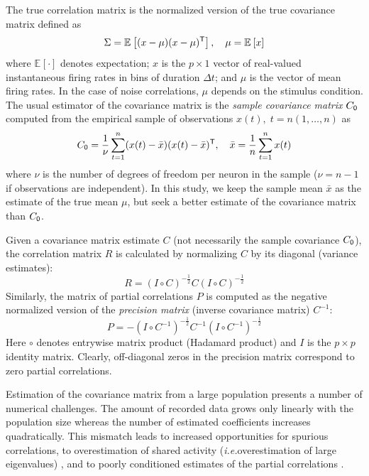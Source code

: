 \documentclass[10pt]{article}
\newcommand{\T}{{\sf T}}
\newcommand{\E}[2][]{\mathbb E_{#1}\left[ #2\right]}    %
\begin{document}
The true correlation matrix is the normalized version of the true covariance matrix defined as
\begin{equation}\label{eq:true-covariance}
    \Sigma = \E{(x-\mu)(x-\mu)^\T},\quad \mu = \E{x}
\end{equation}
where $\E{\cdot}$ denotes expectation; $x$ is the $p\times 1$ vector of real-valued instantaneous firing rates in bins of duration $\Delta t$; and $\mu$ is the vector of mean firing rates. In the case of noise correlations, $\mu$ depends on the stimulus condition.  The usual estimator of the covariance matrix is the \emph{sample covariance matrix} $C_{\sf 0}$ computed from the empirical sample of observations $x(t),\; t=n(1,\ldots,n)$ as
\begin{equation}
    C_{\sf 0} = \frac 1 \nu \sum\limits_{t=1}^n (x(t)-\bar x)(x(t)-\bar x)^\T,\quad \bar x= \frac 1 n \sum\limits_{t=1}^n x(t)
\end{equation}
where $\nu$ is the number of degrees of freedom per neuron in the sample ($\nu=n-1$ if observations are independent). In this study, we keep the sample mean $\bar x$ as the estimate of the true mean $\mu$, but seek a better estimate of the covariance matrix than $C_{\sf 0}$.

Given a covariance matrix estimate $C$ (not necessarily the sample covariance $C_{\sf 0}$), the correlation matrix $R$ is calculated by normalizing $C$ by its diagonal (variance estimates):
\begin{equation}
    R = \left(I\circ C\right)^{-\frac 1 2} C \left(I\circ C\right)^{-\frac 1 2}
\end{equation}
Similarly, the matrix of partial correlations $P$ is computed as the negative normalized version of the \emph{precision matrix} (inverse covariance matrix) $C^{-1}$:
\begin{equation}
    P = -\left(I\circ C^{-1}\right)^{-\frac 1 2} C^{-1} \left(I\circ C^{-1}\right)^{-\frac 1 2}
\end{equation}
Here $\circ$ denotes entrywise matrix product (Hadamard product) and $I$ is the $p\times p$ identity matrix. Clearly, off-diagonal zeros in the precision matrix correspond to zero partial correlations. 

Estimation of the covariance matrix from a large population presents a number of numerical challenges.  The amount of recorded data grows only linearly with the population size whereas the number of estimated coefficients increases quadratically.  This mismatch leads to increased opportunities for spurious correlations, to overestimation of shared activity (\emph{i.e.}\;overestimation of large eigenvalues) \cite{Ledoit:2004}, and to poorly conditioned estimates of the partial correlations \cite{Schafer:2005}.
\end{document}
